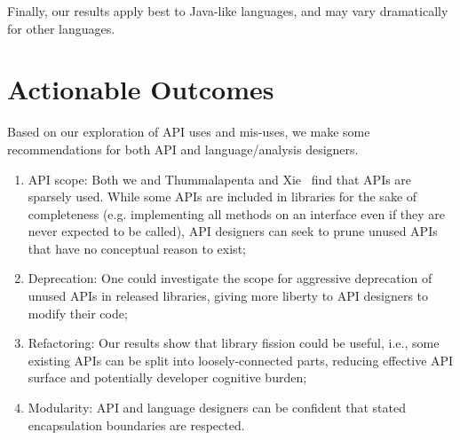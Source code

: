 Finally, our results apply best to Java-like languages, and
may vary dramatically for other languages.

\section{Actionable Outcomes}
Based on our exploration of API uses and mis-uses, we make some recommendations
for both API and language/analysis designers.

\begin{enumerate}
\item API scope: Both we and Thummalapenta and Xie~\cite{thummalapenta08:_spotw} find
that APIs are sparsely used. While some APIs are included in libraries for the sake of completeness (e.g. implementing all methods on an interface even if they are never expected to be called), API designers can seek to prune  unused APIs that have no conceptual reason to exist; 
\item Deprecation: One could investigate the scope for aggressive deprecation of unused APIs in released libraries, giving more liberty to API designers to modify their code;
\item Refactoring: Our results show that library fission could be useful, i.e., some existing APIs can be split into loosely-connected parts, reducing effective API surface and potentially developer cognitive burden;
\item Modularity: API and language designers can be confident that stated encapsulation boundaries are respected.
\end{enumerate}


